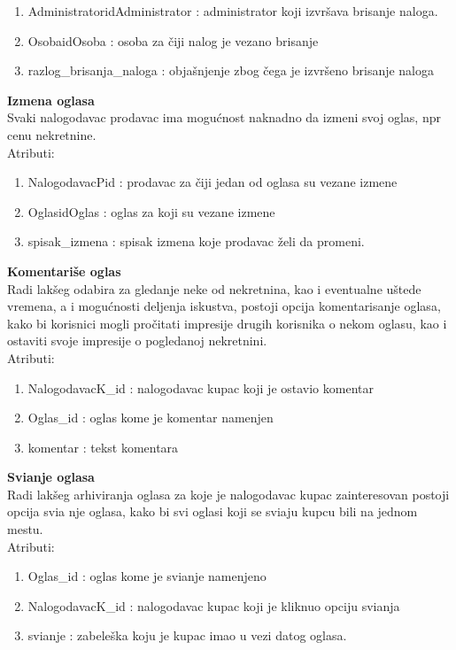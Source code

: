 \documentclass[20pt]{article}
\begin{document}
\begin{enumerate}
        \item  AdministratoridAdministrator : administrator koji izvr\v {s}ava brisanje naloga.
        \item  OsobaidOsoba : osoba za \v {c}iji nalog je vezano brisanje
        \item  razlog\_brisanja\_naloga : obja\v {s}njenje zbog \v {c}ega je izvr\v {s}eno brisanje naloga
\end{enumerate}
{\bfseries Izmena oglasa}\\
Svaki nalogodavac prodavac ima mogu\' cnost naknadno da izmeni svoj oglas, npr cenu nekretnine.\\
\indent Atributi:
\begin{enumerate}
        \item  NalogodavacPid : prodavac za \v {c}iji jedan od oglasa su vezane izmene
        \item OglasidOglas : oglas za koji su vezane izmene
        \item  spisak\_izmena : spisak izmena koje prodavac \v {z}eli da promeni.
\end{enumerate}
{\bfseries Komentari\v {s}e oglas}\\
Radi lak\v {s}eg odabira za gledanje neke od nekretnina, kao i eventualne u\v {s}tede vremena, a i mogu\' cnosti deljenja iskustva, postoji opcija komentarisanje oglasa, kako bi korisnici mogli pro\v {c}itati impresije drugih korisnika o nekom oglasu, kao i ostaviti svoje impresije o pogledanoj nekretnini.\\
\indent Atributi:
\begin{enumerate}
        \item  NalogodavacK\_id : nalogodavac kupac koji je ostavio komentar
        \item  Oglas\_id : oglas kome je komentar namenjen
        \item  komentar : tekst komentara
\end{enumerate}
{\bfseries Svi\dj anje oglasa}\\
Radi lak\v {s}eg arhiviranja oglasa za koje je nalogodavac kupac zainteresovan postoji opcija svi\dj a nje oglasa, kako bi svi oglasi koji se svi\dj aju kupcu bili na jednom mestu.\\
\indent Atributi:
\begin{enumerate}
        \item  Oglas\_id : oglas kome je svi\dj anje namenjeno
        \item  NalogodavacK\_id : nalogodavac kupac koji je kliknuo opciju svi\dj anja
        \item  svi\dj anje : zabele\v {s}ka koju je kupac imao u vezi datog oglasa.
\end{enumerate}
\end{document}
